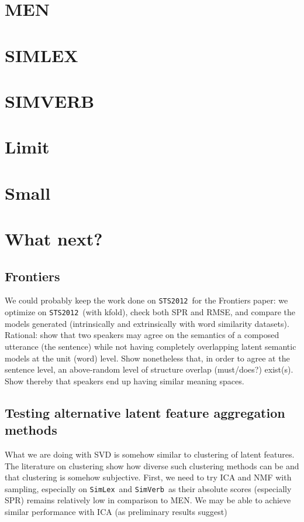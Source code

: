 \documentclass[utf8]{article}
\newcommand\simlex{\texttt{SimLex}}
\newcommand\simverb{\texttt{SimVerb}}
\newcommand\sts{\texttt{STS2012}}
\begin{document}
\section{MEN}

% 

\section{SIMLEX}

% 

\section{SIMVERB}

% 

\section{Limit}


\section{Small}


\section{What next?}

\subsection{Frontiers}
We could probably keep the work done on \sts\ for the Frontiers paper: we optimize on \sts\ (with kfold), check both SPR and RMSE, and compare the models generated (intrinsically and extrinsically with word similarity datasets).
Rational: show that two speakers may agree on the semantics of a composed utterance (the sentence) while not having completely overlapping latent semantic models at the unit (word) level. Show nonetheless that, in order to agree at the sentence level, an above-random level of structure overlap (must/does?) exist(s). Show thereby that speakers end up having similar meaning spaces.

\subsection{Testing alternative latent feature aggregation methods}
What we are doing with SVD is somehow similar to clustering of latent features.
The literature on clustering show how diverse such clustering methods can be and that clustering is somehow subjective. First, we need to try ICA and NMF with sampling, especially on \simlex\ and \simverb\ as their absolute scores (especially SPR) remains relatively low in comparison to MEN. We may be able to achieve similar performance with ICA (as preliminary results suggest)
\end{document}
